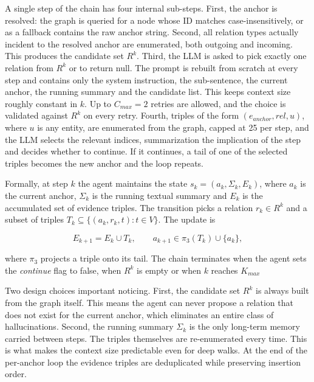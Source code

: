 \documentclass[conference]{IEEEtran}
\begin{document}
A single step of the chain has four internal sub-steps. First, the anchor is resolved: the graph is queried for a node whose ID matches case-insensitively, or as a fallback contains the raw anchor string. Second, all relation types actually incident to the resolved anchor are enumerated, both outgoing and incoming. This produces the candidate set $R^k$. Third, the LLM is asked to pick exactly one relation from $R^k$ or to return null. The prompt is rebuilt from scratch at every step and contains only the system instruction, the sub-sentence, the current anchor, the running summary and the candidate list. This keeps context size roughly constant in $k$. Up to $C_{max} = 2$ retries are allowed, and the choice is validated against $R^k$ on every retry. Fourth, triples of the form $(e_{anchor}, rel, u)$, where $u$ is any entity, are enumerated from the graph, capped at 25 per step, and the LLM selects the relevant indices, summarization the implication of the step and decides whether to continue. If it continues, a tail of one of the selected triples becomes the new anchor and the loop repeats.

Formally, at step $k$ the agent maintains the state $s_k = (a_k, \Sigma_k, E_k)$, where $a_k$ is the current anchor, $\Sigma_k$ is the running textual summary and $E_k$ is the accumulated set of evidence triples. The transition picks a relation $r_k \in R^k$ and a subset of triples $T_k \subseteq \{(a_k, r_k, t): t \in V\}$. The update is 

$$
E_{k+1} = E_k \cup T_k, \qquad a_{k+1} \in \pi_3(T_k) \cup \{a_k\},
$$

where $\pi_3$ projects a triple onto its tail. The chain terminates when the agent sets the \textit{continue} flag to false, when $R^k$ is empty or when $k$ reaches $K_{max}$

Two design choices important noticing. First, the candidate set $R^k$ is always built from the graph itself. This means the agent can never propose a relation that does not exist for the current anchor, which eliminates an entire class of hallucinations. Second, the running summary $\Sigma_k$ is the only long-term memory carried between steps. The triples themselves are re-enumerated every time. This is what makes the context size predictable even for deep walks. At the end of the per-anchor loop the evidence triples are deduplicated while preserving insertion order.
\end{document}
